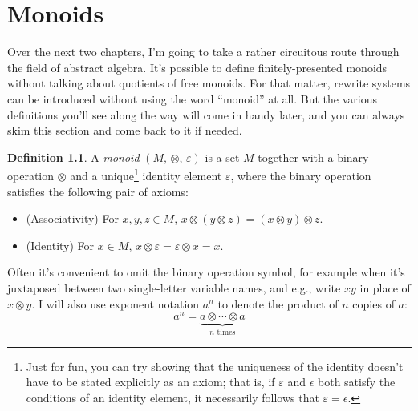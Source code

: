 \documentclass[a4paper,headsepline,bibliography=totoc,toc=flat,fleqn,twoside=semi]{scrbook}
\theoremstyle{definition}
\newtheorem{definition}{Definition}[chapter]
\theoremstyle{definition}
\theoremstyle{definition}
\begin{document}
\chapter{Monoids}\label{monoids}

Over the next two chapters, I'm going to take a rather circuitous route through the field of abstract algebra. It's possible to define finitely-presented monoids without talking about quotients of free monoids. For that matter, rewrite systems can be introduced without using the word ``monoid'' at all. But the various definitions you'll see along the way will come in handy later, and you can always skim this section and come back to it if needed.

\begin{definition} A \emph{monoid} $(M,\, \otimes,\, \varepsilon)$ is a set $M$ together with a binary operation $\otimes$ and a unique\footnote{Just for fun, you can try showing that the uniqueness of the identity doesn't have to be stated explicitly as an axiom; that is, if $\varepsilon$ and $\epsilon$ both satisfy the conditions of an identity element, it necessarily follows that $\varepsilon=\epsilon$.} identity element $\varepsilon$, where the binary operation satisfies the following pair of axioms:
\begin{itemize}
\item (Associativity) For $x, y, z \in M$, $x\otimes(y\otimes z)=(x\otimes y)\otimes z$.
\item (Identity) For $x\in M$, $x\otimes \varepsilon=\varepsilon\otimes x=x$.
\end{itemize}
\end{definition}


Often it's convenient to omit the binary operation symbol, for example when it's juxtaposed between two single-letter variable names, and e.g., write $xy$ in place of $x\otimes y$. I will also use exponent notation $a^n$ to denote the product of $n$ copies of $a$:
\[a^n=\underbrace{a\otimes\cdots\otimes a}_{\textrm{$n$ times}}\]
\end{document}
